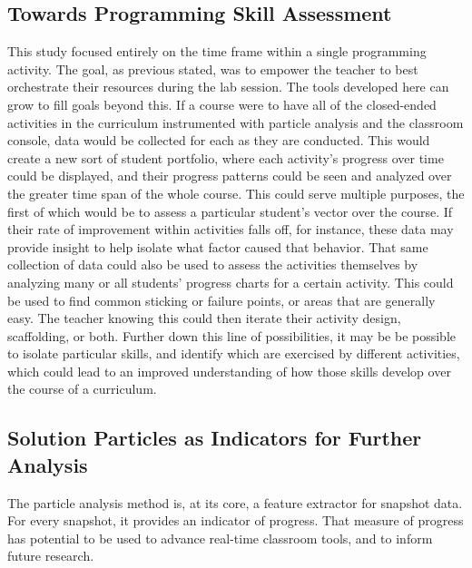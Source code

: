 
\subsection{Towards Programming Skill Assessment}
This study focused entirely on the time frame within a single programming activity. The goal, as previous stated, was to empower the teacher to best orchestrate their resources during the lab session. The tools developed here can grow to fill goals beyond this. If a course were to have all of the closed-ended activities in the curriculum instrumented with particle analysis and the classroom console, data would be collected for each as they are conducted. This would create a new sort of student portfolio, where each activity's progress over time could be displayed, and their progress patterns could be seen and analyzed over the greater time span of the whole course. This could serve multiple purposes, the first of which would be to assess a particular student's vector over the course. If their rate of improvement within activities falls off, for instance, these data may provide insight to help isolate what factor caused that behavior. That same collection of data could also be used to assess the activities themselves by analyzing many or all students' progress charts for a certain activity. This could be used to find common sticking or failure points, or areas that are generally easy. The teacher knowing this could then iterate their activity design, scaffolding, or both. Further down this line of possibilities, it may be be possible to isolate particular skills, and identify which are exercised by different activities, which could lead to an improved understanding of how those skills develop over the course of a curriculum.

\subsection{Solution Particles as Indicators for Further Analysis}
The particle analysis method is, at its core, a feature extractor for snapshot data. For every snapshot, it provides an indicator of progress. That measure of progress has potential to be used to advance real-time classroom tools, and to inform future research. 

